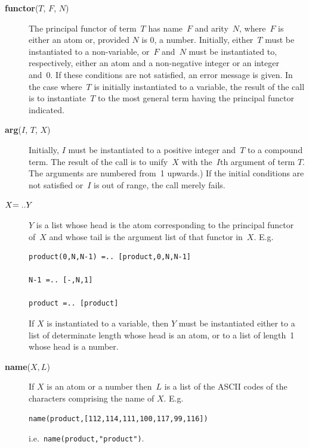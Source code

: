 \begin{description}
\item[{\bf functor}($T$, $F$, $N$)]
    The principal functor of term~$T$ has name~$F$ and arity~$N$,
    where~$F$ is either an atom or, provided $N$ is 0, a number.
    Initially, either~$T$ must be instantiated to a non-variable,
    or~$F$ and~$N$ must be instantiated to, respectively,
    either an atom and a non-negative integer or an integer and~0.
    If these conditions are not satisfied, an error message is given.
    In the case where~$T$ is initially instantiated to a variable,
    the result of the call is to instantiate~$T$ to the most general term
    having the principal functor indicated.

\item[{\bf arg}($I$, $T$, $X$)] 
    Initially, $I$ must be instantiated to a positive integer and~$T$ to
    a compound term.
    The result of the call is to unify~$X$ with the~$I$th argument of term $T$.
    The arguments are numbered from~1 upwards.)
    If the initial conditions are not satisfied or~$I$ is out of range,
    the call merely fails.

\item[$X {\bf =..} Y$] 
    $Y$ is a list whose head is the atom corresponding to the principal
    functor of~$X$ and whose tail is the argument list of that functor in~$X$.
    E.g.\
\begin{center}
\begin{minipage}{2.75in}
\begin{verbatim}
product(0,N,N-1) =.. [product,0,N,N-1]

N-1 =.. [-,N,1]

product =.. [product]
\end{verbatim}
\end{minipage}
\end{center}
    If $X$ is instantiated to a variable,
    then $Y$ must be instantiated
    either to a list of determinate length whose head is an atom,
    or to a list of length~1 whose head is a number.

\item[{\bf name}($X, L$)] 
    If $X$ is an atom or a number then~$L$ is a list of the
    ASCII codes of the characters comprising the name of $X$.
    E.g.
\begin{center}
\begin{minipage}{3.75in}
\begin{verbatim}
name(product,[112,114,111,100,117,99,116])
\end{verbatim}
\end{minipage}
\end{center}
    i.e.\ \verb|name(product,"product")|.


\end{description}
